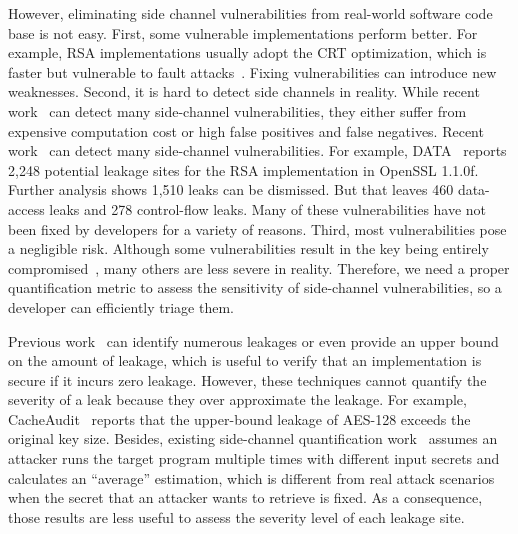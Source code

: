 However, eliminating side channel vulnerabilities from real-world software code base is not easy. First, some vulnerable implementations perform better. For example, RSA implementations usually adopt the CRT optimization,
which is faster but vulnerable to fault attacks~\cite{aumuller2002fault}. Fixing vulnerabilities can introduce new 
weaknesses. Second, it is hard to detect side channels in reality. While recent work~\cite{203878,217537,Wichelmann:2018:MFF:3274694.3274741,Brotzman19Casym,236338,182946} can detect many side-channel vulnerabilities, they either suffer from expensive computation cost or high false positives and false negatives. Recent work~\cite{203878,217537,Wichelmann:2018:MFF:3274694.3274741,Brotzman19Casym,236338,182946} can detect many side-channel vulnerabilities. For example, DATA~\cite{217537} reports 2,248 potential leakage sites for the RSA implementation in OpenSSL 1.1.0f\@. Further analysis shows 1,510 leaks can be dismissed. But that leaves 460 data-access leaks and 278 control-flow leaks. Many of these vulnerabilities have not been fixed by developers for a variety of reasons. Third, most vulnerabilities pose a negligible risk. 
Although some vulnerabilities result in the key being 
entirely compromised~\cite{184415, aumuller2002fault}, 
many others are less severe in reality. Therefore, we need a proper quantification metric to assess the sensitivity of side-channel vulnerabilities, so a developer can efficiently triage them.

Previous work~\cite{182946,5207642} can identify numerous leakages or even provide an upper bound on the amount of leakage, which is useful to verify that an implementation is secure if it incurs zero leakage.
However, these techniques cannot quantify the severity of a leak because they over approximate the leakage. For example, CacheAudit~\cite{182946} 
reports that the upper-bound leakage of AES-128 exceeds the original key size. Besides, existing side-channel quantification work~\cite{182946,5207642} assumes an attacker runs the target program multiple times with different
input secrets and calculates an ``average'' estimation, which is different from real attack scenarios when the secret that an attacker wants to retrieve is fixed. As a consequence, those results are less useful to assess the severity level of each leakage site.


